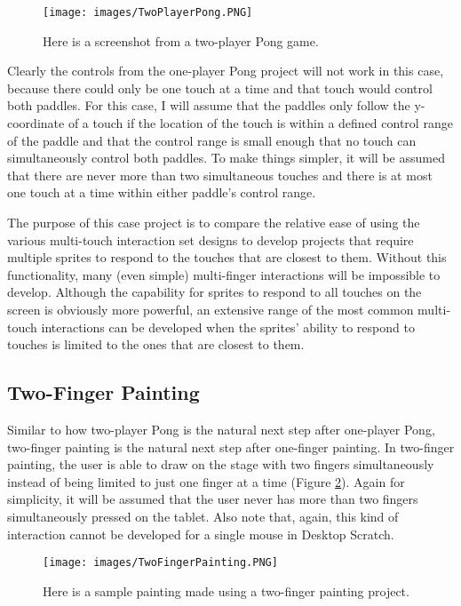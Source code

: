 \begin{figure}
\centering
\texttt{[image: images/TwoPlayerPong.PNG]}
\caption[Two-Player Pong Screenshot]
{Here is a screenshot from a two-player Pong game.}
\label{TwoPlayerPong}
\end{figure}

Clearly the controls from the one-player Pong project will not work in this case, because there could only be one touch at a time and that touch would control both paddles. For this case, I will assume that the paddles only follow the y-coordinate of a touch if the location of the touch is within a defined control range of the paddle and that the control range is small enough that no touch can simultaneously control both paddles. To make things simpler, it will be assumed that there are never more than two simultaneous touches and there is at most one touch at a time within either paddle's control range. 

The purpose of this case project is to compare the relative ease of using the various multi-touch interaction set designs to develop projects that require multiple sprites to respond to the touches that are closest to them. Without this functionality, many (even simple) multi-finger interactions will be impossible to develop. Although the capability for sprites to respond to all touches on the screen is obviously more powerful, an extensive range of the most common multi-touch interactions can be developed when the sprites' ability to respond to touches is limited to the ones that are closest to them.

\subsection{Two-Finger Painting}
Similar to how two-player Pong is the natural next step after one-player Pong, two-finger painting is the natural next step after one-finger painting. In two-finger painting, the user is able to draw on the stage with two fingers simultaneously instead of being limited to just one finger at a time (Figure \ref{TwoFingerPainting}). Again for simplicity, it will be assumed that the user never has more than two fingers simultaneously pressed on the tablet. Also note that, again, this kind of interaction cannot be developed for a single mouse in Desktop Scratch.

\begin{figure}
\centering
\texttt{[image: images/TwoFingerPainting.PNG]}
\caption[Two-Finger Painting Screenshot]
{Here is a sample painting made using a two-finger painting project.}
\label{TwoFingerPainting}
\end{figure}

